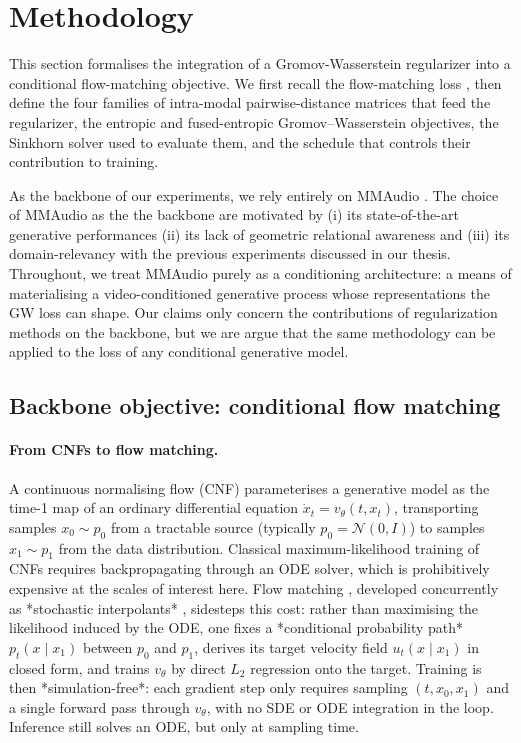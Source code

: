 \section{Methodology}
\label{sec:methodology}

This section formalises the integration of a Gromov-Wasserstein
regularizer into a conditional flow-matching objective. We first
recall the flow-matching loss
\citep{cheng_2025_mmaudio}, then define the four families of
intra-modal pairwise-distance matrices that feed the regularizer,
the entropic and fused-entropic Gromov--Wasserstein objectives, the
Sinkhorn solver used to evaluate them, and the schedule that
controls their contribution to training. 

As the backbone of our experiments, we rely entirely on MMAudio \cite{cheng_2025_mmaudio}. The choice of MMAudio as the the backbone are motivated by (i) its state-of-the-art generative performances (ii) its lack of geometric relational awareness and (iii) its domain-relevancy with the previous experiments discussed in our thesis. 
Throughout, we treat
MMAudio purely as a conditioning architecture: a means of
materialising a video-conditioned generative process whose
representations the GW loss can shape. Our claims only concern the contributions of regularization methods on the backbone, but we are argue that the same methodology can be applied to the loss of any conditional generative model. 

\subsection{Backbone objective: conditional flow matching}
\label{sec:methodology:fm}

\paragraph{From CNFs to flow matching.}
A continuous normalising flow (CNF) parameterises a generative model
as the time-1 map of an ordinary differential equation
$\dot x_t = v_\theta(t, x_t)$, transporting samples
$x_0 \sim p_0$ from a tractable source (typically
$p_0 = \mathcal{N}(0, I)$) to samples $x_1 \sim p_1$ from the data
distribution. Classical maximum-likelihood training of CNFs
requires backpropagating through an ODE solver, which is
prohibitively expensive at the scales of interest here. Flow
matching \citep{lipman_2023_flow}, developed concurrently as
*stochastic interpolants*
\citep{albergo_2023_building, albergo_2023_stochastic}, sidesteps
this cost: rather than maximising the likelihood induced by the
ODE, one fixes a *conditional probability path*
$p_t(x \mid x_1)$ between $p_0$ and $p_1$, derives its target
velocity field $u_t(x \mid x_1)$ in closed form, and trains
$v_\theta$ by direct $L_2$ regression onto the target. Training is
then *simulation-free*: each gradient step only requires sampling
$(t, x_0, x_1)$ and a single forward pass through $v_\theta$, with
no SDE or ODE integration in the loop. Inference still solves an
ODE, but only at sampling time.

